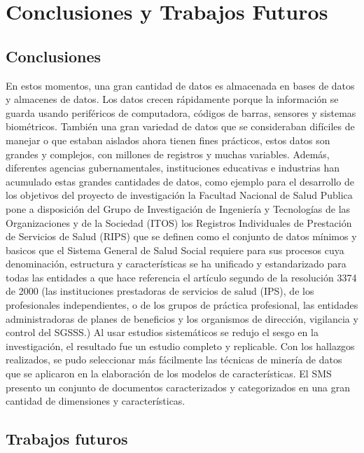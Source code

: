 \chapter{Conclusiones y Trabajos Futuros}

 \section{Conclusiones}



En estos momentos, una gran cantidad de datos es almacenada en bases de datos y almacenes de datos. Los datos crecen rápidamente porque la información se guarda usando periféricos de computadora, códigos de barras, sensores y sistemas biométricos. También una gran variedad de datos que se consideraban difíciles de manejar o que estaban aislados ahora tienen fines prácticos, estos datos son  grandes y complejos, con millones de registros y muchas variables. Además, diferentes agencias gubernamentales, instituciones educativas e industrias han acumulado estas grandes cantidades de datos, como ejemplo para el desarrollo de los objetivos del proyecto de investigación la Facultad Nacional de Salud Publica  pone a disposición del Grupo de Investigación de Ingeniería y Tecnologías de las Organizaciones y de la Sociedad (ITOS) los Registros Individuales de Prestación de Servicios de Salud (RIPS) que se definen como el conjunto de datos mínimos y basicos  que el Sistema General de Salud Social requiere para sus procesos cuya denominación, estructura y características se ha unificado y estandarizado para todas las entidades a que hace referencia el artículo segundo de la resolución 3374 de 2000 (las instituciones prestadoras de servicios de salud (IPS), de los profesionales independientes, o de los grupos de práctica profesional, las entidades administradoras de planes de beneficios y los organismos de dirección, vigilancia y control del SGSSS.) 
Al usar estudios sistemáticos  se redujo el sesgo en la investigación\cite{Petersen2015}, el resultado fue un estudio completo y replicable. Con los hallazgos realizados, se pudo seleccionar más fácilmente las técnicas de minería de datos que se aplicaron en la elaboración de los modelos de características. El SMS presento un conjunto de documentos caracterizados y categorizados en una gran cantidad de dimensiones y características.

\section{Trabajos futuros}